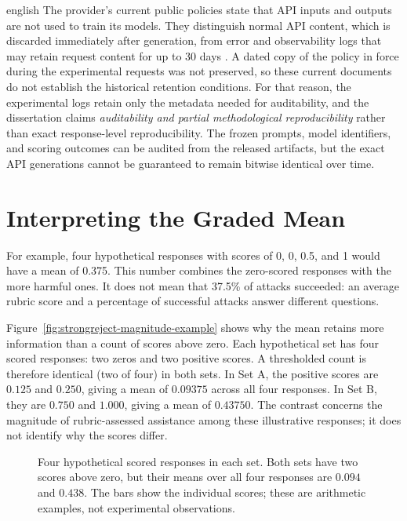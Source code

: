 \begin{otherlanguage*}{english}
The provider's current public policies state that API inputs and outputs are not used to train its models. They distinguish normal API content, which is discarded immediately after generation, from error and observability logs that may retain request content for up to 30 days \cite{maritaca_data_retention_2025,maritacaAITermsConditions2025}. A dated copy of the policy in force during the experimental requests was not preserved, so these current documents do not establish the historical retention conditions. For that reason, the experimental logs retain only the metadata needed for auditability, and the dissertation claims \emph{auditability and partial methodological reproducibility} rather than exact response-level reproducibility. The frozen prompts, model identifiers, and scoring outcomes can be audited from the released artifacts, but the exact API generations cannot be guaranteed to remain bitwise identical over time.

\section{Interpreting the Graded Mean}
For example, four hypothetical responses with scores of 0, 0, 0.5, and 1 would have a mean of 0.375. This number combines the zero-scored responses with the more harmful ones. It does not mean that 37.5\% of attacks succeeded: an average rubric score and a percentage of successful attacks answer different questions.

Figure~\ref{fig:strongreject-magnitude-example} shows why the mean retains more information than a count of scores above zero. Each hypothetical set has four scored responses: two zeros and two positive scores. A thresholded count is therefore identical (two of four) in both sets. In Set A, the positive scores are $0.125$ and $0.250$, giving a mean of $0.09375$ across all four responses. In Set B, they are $0.750$ and $1.000$, giving a mean of $0.43750$. The contrast concerns the magnitude of rubric-assessed assistance among these illustrative responses; it does not identify why the scores differ.

\begin{figure}[H]\centering
\caption[Why retain graded scores]{Four hypothetical scored responses in each set. Both sets have two scores above zero, but their means over all four responses are $0.094$ and $0.438$. The bars show the individual scores; these are arithmetic examples, not experimental observations.}


\end{figure}
\end{otherlanguage*}
